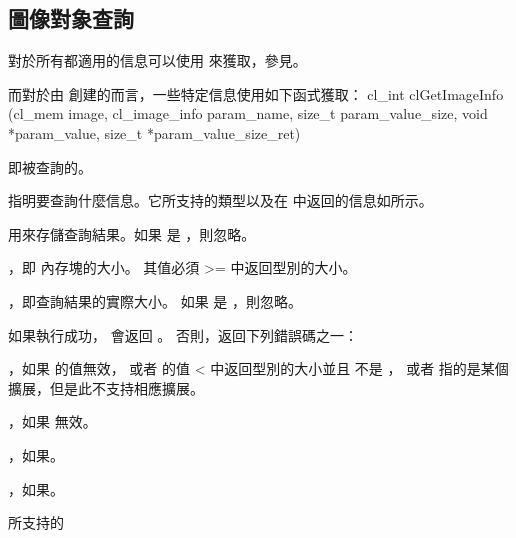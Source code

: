 \subsection{圖像對象查詢}

對於所有都適用的信息可以使用  來獲取，參見。

而對於由  創建的而言，一些特定信息使用如下函式獲取：
\startclc
cl_int clGetImageInfo (cl_mem image,
			cl_image_info param_name,
			size_t param_value_size,
			void *param_value,
			size_t *param_value_size_ret)
\stopclc

 即被查詢的。

 指明要查詢什麼信息。它所支持的類型以及在  中返回的信息如所示。

 用來存儲查詢結果。如果  是 ，則忽略。

，即  內存塊的大小。
其值必須 >= 中返回型別的大小。

，即查詢結果的實際大小。
如果  是 ，則忽略。

如果執行成功，  會返回 。
否則，返回下列錯誤碼之一：
\startigBase
\item {}，如果  的值無效，
或者  的值 < 中返回型別的大小並且  不是 ，
或者  指的是某個擴展，但是此不支持相應擴展。

\item {}，如果  無效。

\item {}，如果\scdevfailres。
\item {}，如果\schostfailres。
\stopigBase

\startbuffer[tblclgetimginfo]
 所支持的 
\stopbuffer

